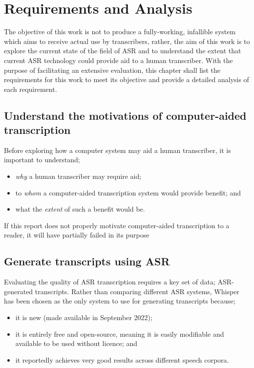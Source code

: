 \chapter{Requirements and Analysis}\label{ch:req-and-analysis}

The objective of this work is not to produce a fully-working, infallible system which aims to receive actual use by transcribers, rather, the aim of this work is to explore the current state of the field of ASR and to understand the extent that current ASR technology could provide aid to a human transcriber.
With the purpose of facilitating an extensive evaluation, this chapter shall list the requirements for this work to meet its objective and provide a detailed analysis of each requirement.

\section{Understand the motivations of computer-aided transcription}

Before exploring how a computer system may aid a human transcriber, it is important to understand;

\begin{itemize}
        \item \emph{why} a human transcriber may require aid;
        \item to \emph{whom} a computer-aided transcription system would provide benefit; and
        \item what the \emph{extent} of such a benefit would be.
\end{itemize}

If this report does not properly motivate computer-aided transcription to a reader, it will have partially failed in its purpose 

\section{Generate transcripts using ASR}\label{sec:generate-transcripts}

Evaluating the quality of ASR transcription requires a key set of data; ASR-generated transcripts.
Rather than comparing different ASR systems, Whisper\cite{whisper} has been chosen as the only system to use for generating transcripts because;

\begin{itemize}
        \item it is new (made available in September 2022);
        \item it is entirely free and open-source, meaning it is easily modifiable and available to be used without licence; and
        \item it reportedly achieves very good results across different speech corpora.
\end{itemize}

